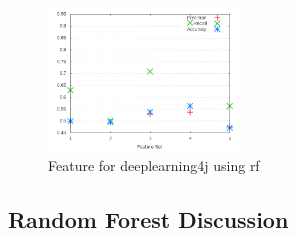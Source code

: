 \begin{figure}[h]
    \centering
        \includegraphics[width=0.45\textwidth]{images/rf/test_3/deeplearning4j_sample_range}
    \caption{Feature for deeplearning4j using \gls{rf}}
    \label{fig:test_3_deeplearning4j_rf}
\end{figure}

\subsection{Random Forest Discussion}
\label{subsec:rf_discussion}









